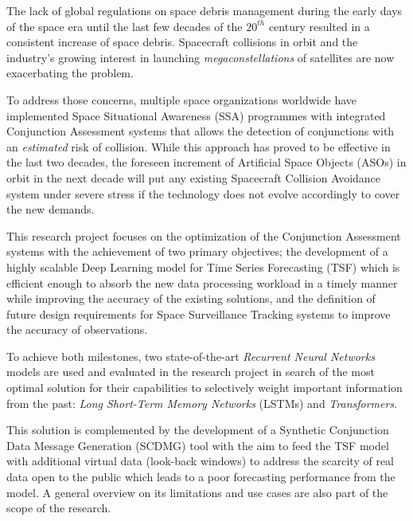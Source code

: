 

The lack of global regulations on space debris management during the early days of the space era until the last few decades of the $20^{th}$ century resulted in a consistent increase of space debris. Spacecraft collisions in orbit and the industry's growing interest in launching \textit{megaconstellations} of satellites are now exacerbating the problem.

To address those concerns, multiple space organizations worldwide have implemented Space Situational Awareness (SSA) programmes with integrated Conjunction Assessment systems that allows the detection of conjunctions with an \textit{estimated} risk of collision. While this approach has proved to be effective in the last two decades, the foreseen increment of Artificial Space Objects (ASOs) in orbit in the next decade will put any existing Spacecraft Collision Avoidance system under severe stress if the technology does not evolve accordingly to cover the new demands.

This research project focuses on the optimization of the Conjunction Assessment systems with the achievement of two primary objectives; the development of a highly scalable Deep Learning model for Time Series Forecasting (TSF) which is efficient enough to absorb the new data processing workload in a timely manner while improving the accuracy of the existing solutions, and the definition of future design requirements for Space Surveillance Tracking systems to improve the accuracy of observations.

To achieve both milestones, two state-of-the-art \textit{Recurrent Neural Networks} models are used and evaluated in the research project in search of the most optimal solution for their capabilities to selectively weight important information from the past: \textit{Long Short-Term Memory Networks} (LSTMs) and \textit{Transformers}. 

This solution is complemented by the development of a Synthetic Conjunction Data Message Generation (SCDMG) tool with the aim to feed the TSF model with additional virtual data (look-back windows) to address the scarcity of real data open to the public which leads to a poor forecasting performance from the model. A general overview on its limitations and use cases are also part of the scope of the research.

